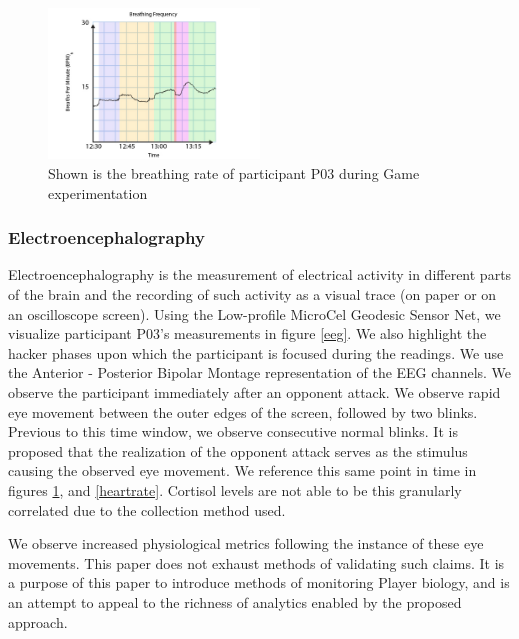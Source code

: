 \documentclass[10pt, titlepage, twocolumn]{article}
\newcommand{\ii}{\indent\indent}
\begin{document}
\begin{figure}[ht]
\centering
	\includegraphics[width=0.5\textwidth]{breathing}
	\caption{Shown is the breathing rate of participant P03 during Game experimentation}
	\label{breathing}
\end{figure}


\subsubsection{Electroencephalography }
\ii
Electroencephalography is the measurement of electrical activity in different parts of the brain and the recording of such activity as a visual trace (on paper or on an oscilloscope screen). Using the Low-profile MicroCel Geodesic Sensor Net, we visualize participant P03's measurements in figure \ref{eeg}. We also highlight the hacker phases upon which the participant is focused during the readings. We use the Anterior - Posterior Bipolar Montage representation of the EEG channels. We observe the participant immediately after an opponent attack. We observe rapid eye movement between the outer edges of the screen, followed by two blinks. Previous to this time window, we observe consecutive normal blinks. It is proposed that the realization of the opponent attack serves as the stimulus causing the observed eye movement. We reference this same point in time in figures \ref{breathing}, and \ref{heartrate}. Cortisol levels are not able to be this granularly correlated due to the collection method used.

We observe increased physiological metrics following the instance of these eye movements. This paper does not exhaust methods of validating such claims. It is a purpose of this paper to introduce methods of monitoring Player biology, and is an attempt to appeal to the richness of analytics enabled by the proposed approach. 
\end{document}
